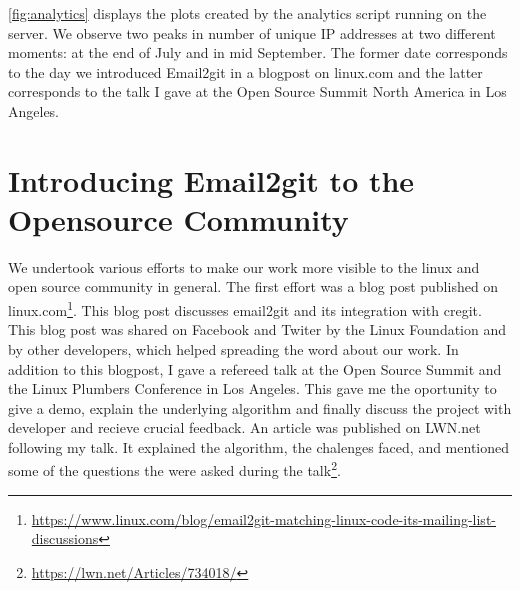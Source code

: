 \autoref{fig:analytics} displays the plots created by the analytics script running on the server. We observe two peaks in number of unique IP addresses at two different moments: at the end of July and in mid September. The former date corresponds to the day we introduced Email2git in a blogpost on linux.com and the latter corresponds to the talk I gave at the Open Source Summit North America in Los Angeles. 



\section{Introducing Email2git to the Opensource Community}

We undertook various efforts to make our work more visible to the linux and open source community in general. The first effort was a blog post published on linux.com\footnote{\url{https://www.linux.com/blog/email2git-matching-linux-code-its-mailing-list-discussions}}. This blog post discusses email2git and its integration with cregit. This blog post was shared on Facebook and Twiter by the Linux Foundation and by other developers, which helped spreading the word about our work. In addition to this blogpost, I gave a refereed talk at the Open Source Summit and the Linux Plumbers Conference in Los Angeles. This gave me the oportunity to give a demo, explain the underlying algorithm and finally discuss the project with developer and recieve crucial feedback. An article was published on LWN.net following my talk. It explained the algorithm, the chalenges faced, and mentioned some of the questions the were asked during the talk\footnote{\url{https://lwn.net/Articles/734018/}}.







